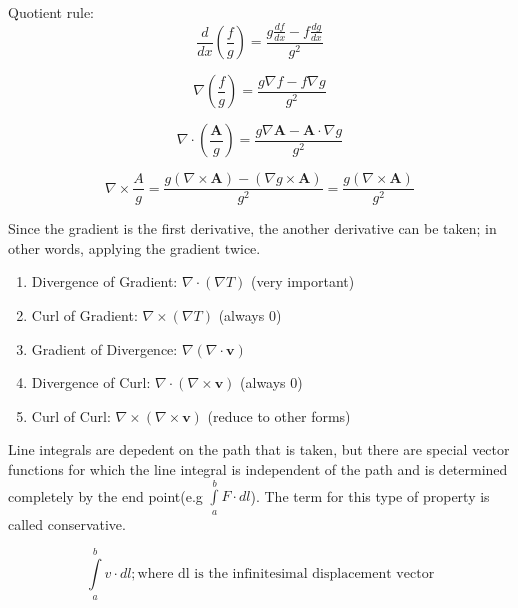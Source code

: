 \newpage

Quotient rule:
\begin{equation}
\frac{d}{dx}(\frac{f}{g})=\frac{g\frac{df}{dx}-f\frac{dg}{dx}}{g^2}
\end{equation}

\begin{equation}
\nabla{(\frac{f}{g})}=\frac{g\nabla{f}-f\nabla{g}}{g^2} 
\end{equation}

\begin{equation}
\nabla{} \cdot (\frac{\mathbf{A}}{g})=\frac{g\nabla{\mathbf{A}}-\mathbf{A} \cdot \nabla{g}}{g^2}
\end{equation}


\begin{equation}
\nabla \times \frac{A}{g}=\frac{g(\nabla \times \mathbf{A})-(\nabla{g}\times \mathbf{A})}{g^2} = \frac{g(\nabla \times \mathbf{A})}{g^2}
\end{equation}

Since the gradient is the first derivative, the another derivative can be taken; in other words, applying the gradient twice.




\begin{enumerate}
\item Divergence of Gradient: \( \nabla{} \cdot (\nabla{T}) \) (very important)
\item Curl of Gradient: \( \nabla \times (\nabla{T}) \) (always 0)
\item Gradient of Divergence: \( \nabla{(\nabla{} \cdot \mathbf{v})} \)
\item Divergence of Curl: \( \nabla{} \cdot (\nabla \times \mathbf{v}) \) (always 0)
\item Curl of Curl: \( \nabla \times (\nabla \times \mathbf{v}) \) (reduce to other forms)

\end{enumerate}

Line integrals are depedent on the path that is taken, but there are special vector functions for which the line integral is independent of the path and is determined completely by the end point(e.g \( \int\limits_{a}^{b}F\cdot dl \)). The term for this type of property is called conservative.


\begin{equation}
\int\limits_{a}^{b}v\cdot dl; \text{where dl is the infinitesimal displacement vector}
\end{equation}


